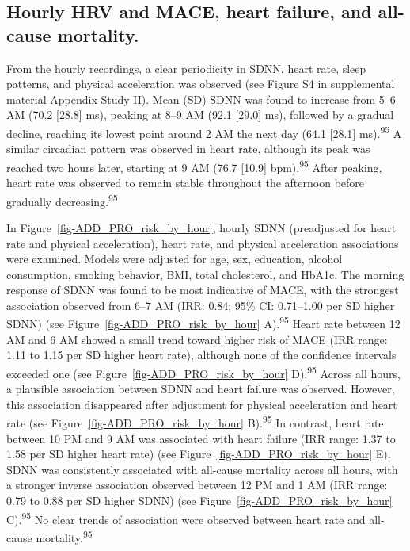 \documentclass[
  a4paper,
  headsepline=true,
  open=left]{scrbook}
\begin{document}
\hypertarget{hourly-hrv-and-mace-heart-failure-and-all-cause-mortality.}{%
\subsection{Hourly HRV and MACE, heart failure, and all-cause
mortality.}\label{hourly-hrv-and-mace-heart-failure-and-all-cause-mortality.}}

From the hourly recordings, a clear periodicity in SDNN, heart rate,
sleep patterns, and physical acceleration was observed (see Figure S4 in
supplemental material Appendix Study II). Mean (SD) SDNN was found to
increase from 5--6 AM (70.2 {[}28.8{]} ms), peaking at 8--9 AM (92.1
{[}29.0{]} ms), followed by a gradual decline, reaching its lowest point
around 2 AM the next day (64.1 {[}28.1{]} ms).\textsuperscript{95} A
similar circadian pattern was observed in heart rate, although its peak
was reached two hours later, starting at 9 AM (76.7 {[}10.9{]}
bpm).\textsuperscript{95} After peaking, heart rate was observed to
remain stable throughout the afternoon before gradually
decreasing.\textsuperscript{95}

In Figure~\ref{fig-ADD_PRO_risk_by_hour}, hourly SDNN (preadjusted for
heart rate and physical acceleration), heart rate, and physical
acceleration associations were examined. Models were adjusted for age,
sex, education, alcohol consumption, smoking behavior, BMI, total
cholesterol, and HbA1c. The morning response of SDNN was found to be
most indicative of MACE, with the strongest association observed from
6--7 AM (IRR: 0.84; 95\% CI: 0.71--1.00 per SD higher SDNN) (see
Figure~\ref{fig-ADD_PRO_risk_by_hour} A).\textsuperscript{95} Heart rate
between 12 AM and 6 AM showed a small trend toward higher risk of MACE
(IRR range: 1.11 to 1.15 per SD higher heart rate), although none of the
confidence intervals exceeded one (see
Figure~\ref{fig-ADD_PRO_risk_by_hour} D).\textsuperscript{95} Across all
hours, a plausible association between SDNN and heart failure was
observed. However, this association disappeared after adjustment for
physical acceleration and heart rate (see
Figure~\ref{fig-ADD_PRO_risk_by_hour} B).\textsuperscript{95} In
contrast, heart rate between 10 PM and 9 AM was associated with heart
failure (IRR range: 1.37 to 1.58 per SD higher heart rate) (see
Figure~\ref{fig-ADD_PRO_risk_by_hour} E). SDNN was consistently
associated with all-cause mortality across all hours, with a stronger
inverse association observed between 12 PM and 1 AM (IRR range: 0.79 to
0.88 per SD higher SDNN) (see Figure~\ref{fig-ADD_PRO_risk_by_hour}
C).\textsuperscript{95} No clear trends of association were observed
between heart rate and all-cause mortality.\textsuperscript{95}
\end{document}
